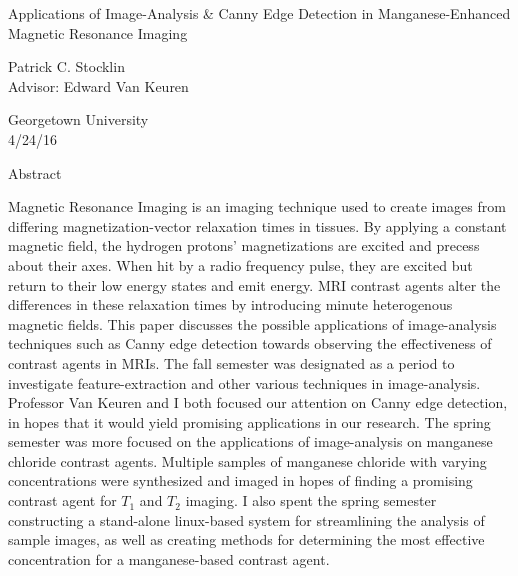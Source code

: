 \documentclass[a4paper,12pt]{article}
\begin{document}
	\begin{center}
	\vspace{0.5cm}
	\huge{Applications of Image-Analysis \& Canny Edge Detection in Manganese-Enhanced Magnetic Resonance Imaging}\\
	\vspace{0.5cm}

	\singlespacing
	\small{Patrick C. Stocklin}\\

	\small{Advisor: Edward Van Keuren}

	\small{Georgetown University}\\

	\small{4/24/16}\\
	\end{center}

\begin{section}{Abstract}
\singlespacing

Magnetic Resonance Imaging is an imaging technique used to create images from differing magnetization-vector relaxation times in tissues. By applying a constant magnetic field, the hydrogen protons' magnetizations are excited and precess about their axes. When hit by a radio frequency pulse, they are excited but return to their low energy states and emit energy. MRI contrast agents alter the differences in these relaxation times by introducing minute heterogenous magnetic fields. This paper discusses the possible applications of image-analysis techniques such as Canny edge detection towards observing the effectiveness of contrast agents in MRIs. The fall semester was designated as a period to investigate feature-extraction and other various techniques in image-analysis. Professor Van Keuren and I both focused our attention on Canny edge detection, in hopes that it would yield promising applications in our research. The spring semester was more focused on the applications of image-analysis on manganese chloride contrast agents. Multiple samples of manganese chloride with varying concentrations were synthesized and imaged in hopes of finding a promising contrast agent for $T_1$ and $T_2$ imaging. I also spent the spring semester constructing a stand-alone linux-based system for streamlining the analysis of sample images, as well as creating methods for determining the most effective concentration for a manganese-based contrast agent.


\end{section}
\end{document}
